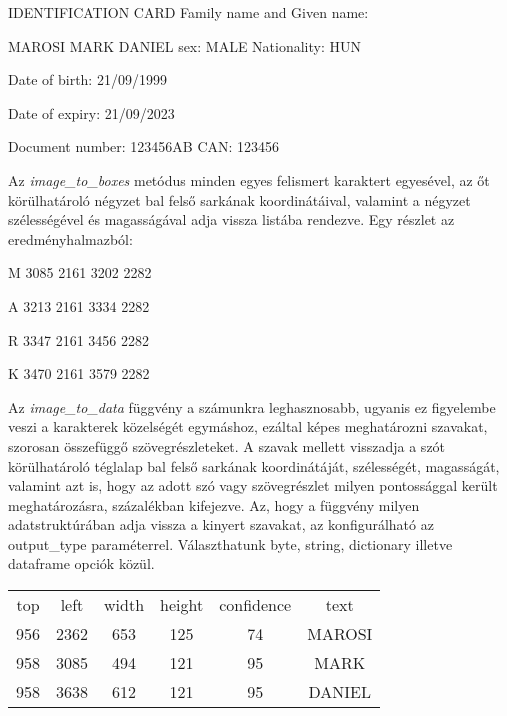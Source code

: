 \documentclass[12pt]{report}
\begin{document}
\begin{tcolorbox}
    IDENTIFICATION CARD
    \newline
    Family name and Given name:

    MAROSI MARK DANIEL
    \newline
    sex: MALE Nationality: HUN

    Date of birth: 21/09/1999

    Date of expiry: 21/09/2023

    Document number: 123456AB
    \newline
    CAN: 123456
\end{tcolorbox}

Az \textit{image\_to\_boxes} metódus minden egyes felismert karaktert egyesével, az őt körülhatároló négyzet bal felső sarkának koordinátáival, valamint a négyzet szélességével és magasságával adja vissza listába rendezve.
Egy részlet az eredményhalmazból:

\begin{tcolorbox}
M 3085 2161 3202 2282

A 3213 2161 3334 2282

R 3347 2161 3456 2282

K 3470 2161 3579 2282
\end{tcolorbox}

Az \textit{image\_to\_data} függvény a számunkra leghasznosabb, ugyanis ez figyelembe veszi a karakterek közelségét egymáshoz, ezáltal képes meghatározni szavakat, szorosan összefüggő szövegrészleteket. A szavak mellett visszadja a szót körülhatároló téglalap bal felső sarkának koordinátáját, szélességét, magasságát, valamint azt is, hogy az adott szó vagy szövegrészlet milyen pontossággal került meghatározásra, százalékban kifejezve.
Az, hogy a függvény milyen adatstruktúrában adja vissza a kinyert szavakat, az konfigurálható az output\_type paraméterrel. Választhatunk byte, string, dictionary illetve dataframe opciók közül.

\begin{tcolorbox}
    \begin{center}
        \begin{tabular}{ c c c c c c }
         top & left & width & height & confidence & text \\ 
         956 & 2362 & 653 & 125 & 74 & MAROSI \\  
         958 & 3085 & 494 & 121 & 95 & MARK \\  
         958 & 3638 & 612 & 121 & 95 & DANIEL \\  
        \end{tabular}
    \end{center}
\end{tcolorbox}
\end{document}
